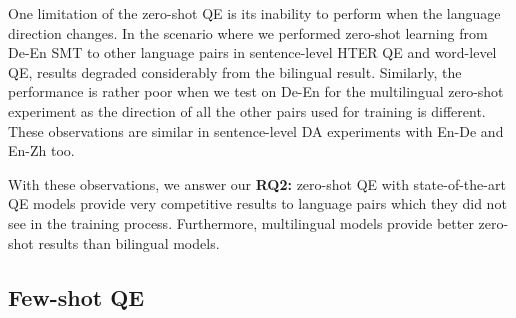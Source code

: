 One limitation of the zero-shot QE is its inability to perform when the language direction changes. In the scenario where we performed zero-shot learning from De-En SMT to other language pairs in sentence-level HTER QE and word-level QE, results degraded considerably from the bilingual result. Similarly, the performance is rather poor when we test on De-En for the multilingual zero-shot experiment as the direction of all the other pairs used for training is different. These observations are similar in sentence-level DA experiments with En-De and En-Zh too.

With these observations, we answer our \textbf{RQ2:} zero-shot QE with state-of-the-art QE models provide very competitive results to language pairs which they did not see in the training process. Furthermore, multilingual models provide better zero-shot results than bilingual models.

\subsection{Few-shot QE}
\label{sec:multilingual_fewshot}

